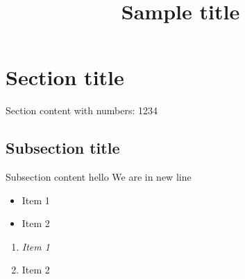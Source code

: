 

\title{Sample title}

\section{Section title}
Section content with numbers: 1234

\subsection{Subsection title}
Subsection content hello
We are in new line

\begin{itemize}

\item Item 1
\item Item 2

\end{itemize}

\begin{enumerate}

\item \textit{Item 1}
\item Item 2

\end{enumerate}

